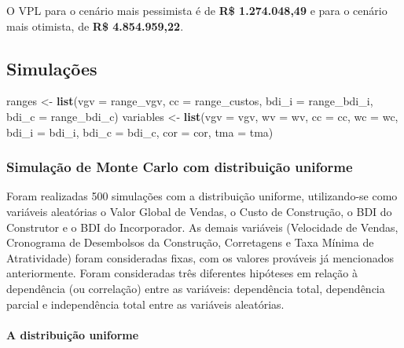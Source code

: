\documentclass[a4paper]{article}
\newenvironment{Shaded}{\begin{snugshade}}{\end{snugshade}}
\newcommand{\KeywordTok}[1]{\textcolor[rgb]{0.13,0.29,0.53}{\textbf{#1}}}
\newcommand{\DataTypeTok}[1]{\textcolor[rgb]{0.13,0.29,0.53}{#1}}
\newcommand{\StringTok}[1]{\textcolor[rgb]{0.31,0.60,0.02}{#1}}
\newcommand{\NormalTok}[1]{#1}
\let\oldparagraph\paragraph
\renewcommand{\paragraph}[1]{\oldparagraph{#1}\mbox{}}
\begin{document}
O VPL para o cenário mais pessimista é de \textbf{R\$ 1.274.048,49} e
para o cenário mais otimista, de \textbf{R\$ 4.854.959,22}.

\subsection{Simulações}\label{simulacoes}

\begin{Shaded}
\begin{Highlighting}[]
\NormalTok{ranges <-}\StringTok{ }\KeywordTok{list}\NormalTok{(}\DataTypeTok{vgv =}\NormalTok{ range_vgv, }
               \DataTypeTok{cc =}\NormalTok{ range_custos, }
               \DataTypeTok{bdi_i =}\NormalTok{ range_bdi_i, }
               \DataTypeTok{bdi_c =}\NormalTok{ range_bdi_c)}
\NormalTok{variables <-}\StringTok{ }\KeywordTok{list}\NormalTok{(}\DataTypeTok{vgv =}\NormalTok{ vgv, }\DataTypeTok{wv =}\NormalTok{ wv, }\DataTypeTok{cc =}\NormalTok{ cc, }\DataTypeTok{wc =}\NormalTok{ wc, }
                  \DataTypeTok{bdi_i =}\NormalTok{ bdi_i, }\DataTypeTok{bdi_c =}\NormalTok{ bdi_c, }\DataTypeTok{cor =}\NormalTok{ cor, }
                  \DataTypeTok{tma =}\NormalTok{ tma)}
\end{Highlighting}
\end{Shaded}

\subsubsection{Simulação de Monte Carlo com distribuição
uniforme}\label{simulacao-de-monte-carlo-com-distribuicao-uniforme}

Foram realizadas 500 simulações com a distribuição uniforme,
utilizando-se como variáveis aleatórias o Valor Global de Vendas, o
Custo de Construção, o BDI do Construtor e o BDI do Incorporador. As
demais variáveis (Velocidade de Vendas, Cronograma de Desembolsos da
Construção, Corretagens e Taxa Mínima de Atratividade) foram
consideradas fixas, com os valores prováveis já mencionados
anteriormente. Foram consideradas três diferentes hipóteses em relação à
dependência (ou correlação) entre as variáveis: dependência total,
dependência parcial e independência total entre as variáveis aleatórias.

\paragraph{A distribuição uniforme}\label{a-distribuicao-uniforme}
\end{document}
